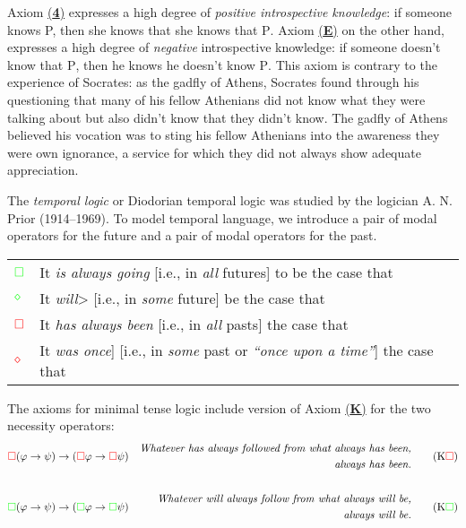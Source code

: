 \documentclass[
  12pt,
  letterpaper,
  DIV=11,
  numbers=noendperiod,
  twoside]{scrreprt}
\theoremstyle{remark}
\begin{document}
Axiom \hyperref[eq-modal-axiom-4]{(\textbf{4})} expresses a high degree
of \emph{positive introspective knowledge}: if someone knows P, then she
knows that she knows that \(\mathrm{P}\). Axiom
\hyperref[eq-modal-axiom-E]{(\textbf{E})} on the other hand, expresses a
high degree of \emph{negative} introspective knowledge: if someone
doesn't know that \(\mathrm{P}\), then he knows he doesn't know
\(\mathrm{P}\). This axiom is contrary to the experience of Socrates: as
the gadfly of Athens, Socrates found through his questioning that many
of his fellow Athenians did not know what they were talking about but
also didn't know that they didn't know. The gadfly of Athens believed
his vocation was to sting his fellow Athenians into the awareness they
were own ignorance, a service for which they did not always show
adequate appreciation.

The \emph{temporal logic} or Diodorian temporal logic was studied by the
logician A. N. Prior (1914--1969). To model temporal language, we
introduce a pair of modal operators for the future and a pair of modal
operators for the past.

\begin{longtable}[]{@{}
  >{\centering\arraybackslash}p{}
  >{\raggedright\arraybackslash}p{}@{}}
\toprule\noalign{}
\endhead
\bottomrule\noalign{}
\endlastfoot
\(\color{green}\Box\) & It {\color{green} \emph{is always going}}
{[}i.e., in \emph{all} futures{]} to be the case that \\
\(\color{green}{\Large\diamond}\) & It {\color{green}
\emph{will}\textgreater{}} {[}i.e., in \emph{some} future{]} be the case
that \\
\(\color{red}\Box\) & It {\color{red} \emph{has always been}} {[}i.e.,
in \emph{all} pasts{]} the case that \\
\(\color{red}{\Large\diamond}\) & It {\color{red} \emph{was once}{]}}
{[}i.e., in \emph{some} past or \emph{``once upon a time''}{]} the case
that \\
\end{longtable}

The axioms for minimal tense logic include version of Axiom
\hyperref[eq-modal-axiom-K]{(\textbf{K})} for the two necessity
operators: \begin{align*}
&{\color{red}\Box}(\varphi\to\psi)\to({\color{red}\Box}\varphi\to{\color{red}\Box}\psi)
&\begin{aligned}\text{\textit{Whatever has always followed from what always has been,}}\\\text{\textit{always has been.}}\end{aligned}&
\tag*{(K${\color{red}\Box}$)}\\\\
&{\color{green}\Box}(\varphi\to\psi)\to({\color{green}\Box}\varphi\to{\color{green}\Box}\psi)
&\begin{aligned}\text{\textit{Whatever will always follow from what always will be,}}\\\text{\textit{always will be.}}\end{aligned}&
\tag*{(K${\color{green}\Box}$)}
\end{align*}
\end{document}
